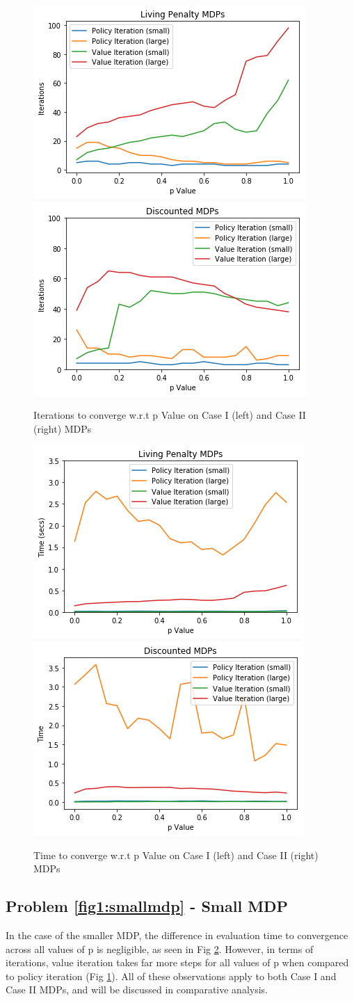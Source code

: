 \documentclass[letter]{article}
\begin{document}
\begin{figure}[]
    \centering
    \includegraphics[width=.4\linewidth]{penalty_iterations.png}
    \includegraphics[width=.4\linewidth]{discounted_iterations.png}
    \caption{Iterations to converge w.r.t p Value on Case I (left) and Case II (right) MDPs}
    \label{iterationsFig}
\end{figure}


\begin{figure}[]
    \centering
    \includegraphics[width=.4\linewidth]{penalty_time.png}
    \includegraphics[width=.4\linewidth]{discounted_time.png}
    \caption{Time to converge w.r.t p Value on Case I (left) and Case II (right) MDPs}
    \label{timeFig}
\end{figure}

\subsection{Problem \ref{fig1:smallmdp} - Small MDP}
In the case of the smaller MDP, the difference in evaluation time to convergence across all values of p is negligible, as seen in Fig \ref{timeFig}. However, in terms of iterations, value iteration takes far more steps for all values of p when compared to policy iteration (Fig \ref{iterationsFig}). All of these observations apply to both Case I and Case II MDPs, and will be discussed in comparative analysis.
\end{document}
